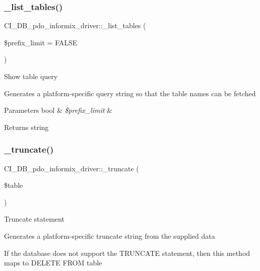 \subsubsection{\texorpdfstring{\+\_\+list\+\_\+tables()}{\_list\_tables()}}
{\footnotesize\ttfamily C\+I\+\_\+\+D\+B\+\_\+pdo\+\_\+informix\+\_\+driver\+::\+\_\+list\+\_\+tables (\begin{DoxyParamCaption}\item[{}]{\$prefix\+\_\+limit = {\ttfamily FALSE} }\end{DoxyParamCaption})\hspace{0.3cm}{\ttfamily [protected]}}

Show table query

Generates a platform-\/specific query string so that the table names can be fetched


\begin{DoxyParams}[1]{Parameters}
bool & {\em \$prefix\+\_\+limit} & \\
\hline
\end{DoxyParams}
\begin{DoxyReturn}{Returns}
string 
\end{DoxyReturn}
\mbox{\label{class_c_i___d_b__pdo__informix__driver_a0412f7b07e3d5df616aea1533cea597b}} 
\subsubsection{\texorpdfstring{\+\_\+truncate()}{\_truncate()}}
{\footnotesize\ttfamily C\+I\+\_\+\+D\+B\+\_\+pdo\+\_\+informix\+\_\+driver\+::\+\_\+truncate (\begin{DoxyParamCaption}\item[{}]{\$table }\end{DoxyParamCaption})\hspace{0.3cm}{\ttfamily [protected]}}

Truncate statement

Generates a platform-\/specific truncate string from the supplied data

If the database does not support the T\+R\+U\+N\+C\+A\+TE statement, then this method maps to \textquotesingle{}D\+E\+L\+E\+TE F\+R\+OM table\textquotesingle{}


